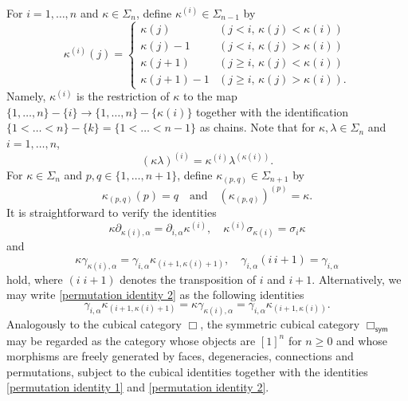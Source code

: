 \documentclass[oneside, 12pt]{amsart}
\numberwithin{equation}{section}
\theoremstyle{plain}
\theoremstyle{definition}
\theoremstyle{remark}
\begin{document}
	For $i=1,\ldots,n$ and $\kappa\in\Sigma_n$, define $\kappa^{(i)}\in\Sigma_{n-1}$ by
	\[
	\kappa^{(i)}(j)=
	\begin{cases}
		\kappa(j)&(j<i,\,\kappa(j)<\kappa(i))\\
		\kappa(j)-1&(j<i,\,\kappa(j)>\kappa(i))\\
		\kappa(j+1)&(j\ge i,\,\kappa(j)<\kappa(i))\\
		\kappa(j+1)-1&(j\ge i,\,\kappa(j)>\kappa(i)).
	\end{cases}
	\]
	Namely, $\kappa^{(i)}$ is the restriction of $\kappa$ to the map $\{1,\ldots,n\}-\{i\}\to\{1,\ldots,n\}-\{\kappa(i)\}$ together with the identification $\{1<\ldots<n\}-\{k\}=\{1<\ldots<n-1\}$ as chains. Note that for $\kappa,\lambda\in\Sigma_n$ and $i=1,\ldots,n$,
	\begin{equation}
		\label{permutation deletion}
		(\kappa\lambda)^{(i)}=\kappa^{(i)}\lambda^{(\kappa(i))}.
	\end{equation}
	For $\kappa\in\Sigma_n$ and $p,q\in\{1,\ldots,n+1\}$, define $\kappa_{(p,q)}\in\Sigma_{n+1}$ by
	\[
	\kappa_{(p,q)}(p)=q\quad\text{and}\quad(\kappa_{(p,q)})^{(p)}=\kappa.
	\]
	It is straightforward to verify the identities
	\begin{equation}
		\label{permutation identity 1}
		\kappa\partial_{\kappa(i),\alpha}=\partial_{i,\alpha}\kappa^{(i)},\quad\kappa^{(i)}\sigma_{\kappa(i)}=\sigma_i\kappa
	\end{equation}
	and
	\begin{equation}
		\label{permutation identity 2}
		\kappa\gamma_{\kappa(i),\alpha}=\gamma_{i,\alpha}\kappa_{(i+1,\kappa(i)+1)},\quad\gamma_{i,\alpha}(i\,i+1)=\gamma_{i,\alpha}
	\end{equation}
	hold, where $(i\;i+1)$ denotes the transposition of $i$ and $i+1$. Alternatively, we may write \eqref{permutation identity 2} as the following identities
	\begin{equation}
		\label{permutation identity 2 alternative}
		\gamma_{i,\alpha}\kappa_{(i+1,\kappa(i)+1)}=\kappa\gamma_{\kappa(i),\alpha}=\gamma_{i,\alpha}\kappa_{(i+1,\kappa(i))}.
	\end{equation}
	Analogously to the cubical category $\Box$, the symmetric cubical category $\Box_\mathsf{sym}$ may be regarded as the category whose objects are $[1]^n$ for $n\ge 0$ and whose morphisms are freely generated by faces, degeneracies, connections and permutations, subject to the cubical identities together with the identities \eqref{permutation identity 1} and \eqref{permutation identity 2}.
	
\end{document}
